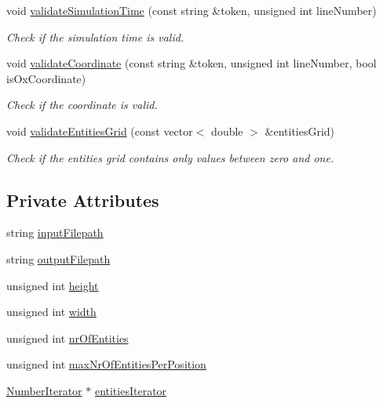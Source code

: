 \begin{DoxyCompactItemize}
void \hyperlink{classmultiscale_1_1video_1_1RectangularEntityCsvToInputFilesConverter_a8e331c649351b19275852c78688b9b6e}{validate\-Simulation\-Time} (const string \&token, unsigned int line\-Number)
\begin{DoxyCompactList}\small\item\em Check if the simulation time is valid. \end{DoxyCompactList}\item 
void \hyperlink{classmultiscale_1_1video_1_1RectangularEntityCsvToInputFilesConverter_a650edb40b60f1d51645d0d3cc502d348}{validate\-Coordinate} (const string \&token, unsigned int line\-Number, bool is\-Ox\-Coordinate)
\begin{DoxyCompactList}\small\item\em Check if the coordinate is valid. \end{DoxyCompactList}\item 
void \hyperlink{classmultiscale_1_1video_1_1RectangularEntityCsvToInputFilesConverter_a1ad5a7d2ff08fdda7ff04571e229cf95}{validate\-Entities\-Grid} (const vector$<$ double $>$ \&entities\-Grid)
\begin{DoxyCompactList}\small\item\em Check if the entities grid contains only values between zero and one. \end{DoxyCompactList}\end{DoxyCompactItemize}
\subsection*{Private Attributes}
\begin{DoxyCompactItemize}
\item 
string \hyperlink{classmultiscale_1_1video_1_1RectangularEntityCsvToInputFilesConverter_adde5ccc0bde141f73917eba8029fe1f6}{input\-Filepath}
\item 
string \hyperlink{classmultiscale_1_1video_1_1RectangularEntityCsvToInputFilesConverter_a84ea5fc8e195a17eb929812f962cb851}{output\-Filepath}
\item 
unsigned int \hyperlink{classmultiscale_1_1video_1_1RectangularEntityCsvToInputFilesConverter_a68cb5dba20157ea4977c1069626cb0ab}{height}
\item 
unsigned int \hyperlink{classmultiscale_1_1video_1_1RectangularEntityCsvToInputFilesConverter_ac4542ad4008e85ab4860146eed6e0200}{width}
\item 
unsigned int \hyperlink{classmultiscale_1_1video_1_1RectangularEntityCsvToInputFilesConverter_aebbddb80b0b0e44e4ea8e111994a2f5d}{nr\-Of\-Entities}
\item 
unsigned int \hyperlink{classmultiscale_1_1video_1_1RectangularEntityCsvToInputFilesConverter_adcea224ee3e6f8fbecca3754774afbac}{max\-Nr\-Of\-Entities\-Per\-Position}
\item 
\hyperlink{classmultiscale_1_1NumberIterator}{Number\-Iterator} $\ast$ \hyperlink{classmultiscale_1_1video_1_1RectangularEntityCsvToInputFilesConverter_a128a6c07e713073f96405819b014249e}{entities\-Iterator}
\end{DoxyCompactItemize}
